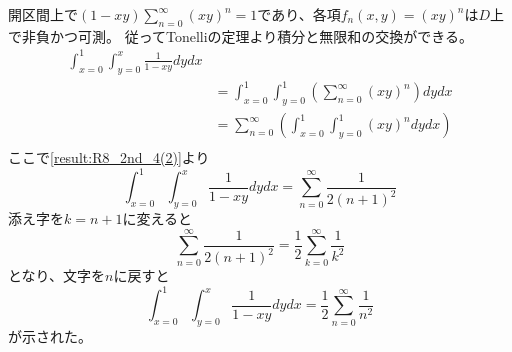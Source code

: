 \begin{souanswer}
\begin{enumerate}
    開区間上で$(1- xy)\sum_{n= 0}^\infty (xy)^n= 1$であり、各項$f_n(x, y)= (xy)^n$は$D$上で非負かつ可測。
    従ってTonelliの定理より積分と無限和の交換ができる。
\begin{align*}
    \int_{x= 0}^1\int_{y= 0}^x \frac{1}{1- xy}dydx\\
    &= \int_{x= 0}^1\int_{y= 0}^1\left(\sum_{n= 0}^\infty (xy)^n\right)dydx\\
    &= \sum_{n= 0}^\infty\left(\int_{x= 0}^1\int_{y= 0}^1 (xy)^ndydx\right)\\
\end{align*}
    ここで\ref{result:R8_2nd_4(2)}より
\begin{equation*}
    \int_{x= 0}^1 \int_{y= 0}^x \frac{1}{1- xy}dydx= \sum_{n= 0}^\infty \frac{1}{2(n+ 1)^2}
\end{equation*}
    添え字を$k= n+ 1$に変えると
\begin{equation*}
    \sum_{n= 0}^\infty \frac{1}{2(n+ 1)^2}= \frac{1}{2}\sum_{k= 0}^\infty \frac{1}{k^2}
\end{equation*}
    となり、文字を$n$に戻すと
\begin{equation*}
    \int_{x= 0}^1 \int_{y= 0}^x \frac{1}{1- xy}dydx= \frac{1}{2}\sum_{n= 0}^\infty \frac{1}{n^2}
\end{equation*}
    が示された。
\end{enumerate}
\end{souanswer}

